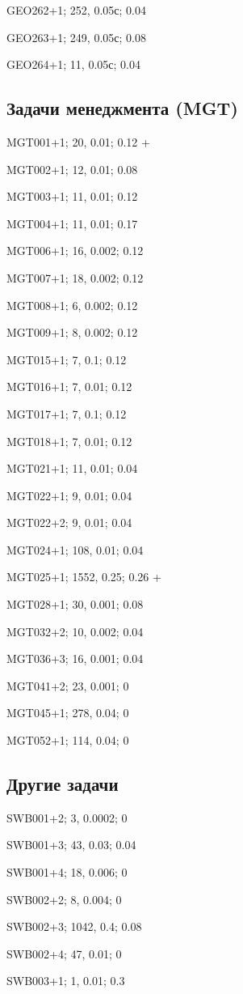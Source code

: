 GEO262+1; 252, 0.05с; 0.04

GEO263+1; 249, 0.05с; 0.08

GEO264+1; 11, 0.05с; 0.04


\subsection*{Задачи менеджмента (MGT)}

MGT001+1; 20, 0.01; 0.12 +

MGT002+1; 12, 0.01; 0.08

MGT003+1; 11, 0.01; 0.12

MGT004+1; 11, 0.01; 0.17

MGT006+1; 16, 0.002; 0.12

MGT007+1; 18, 0.002; 0.12

MGT008+1; 6, 0.002; 0.12

MGT009+1; 8, 0.002; 0.12

MGT015+1; 7, 0.1; 0.12

MGT016+1; 7, 0.01; 0.12

MGT017+1; 7, 0.1; 0.12

MGT018+1; 7, 0.01; 0.12

MGT021+1; 11, 0.01; 0.04

MGT022+1; 9, 0.01; 0.04

MGT022+2; 9, 0.01; 0.04

MGT024+1; 108, 0.01; 0.04

MGT025+1; 1552, 0.25; 0.26 +

MGT028+1; 30, 0.001; 0.08

MGT032+2; 10, 0.002; 0.04

MGT036+3; 16, 0.001; 0.04

MGT041+2; 23, 0.001; 0

MGT045+1; 278, 0.04; 0

MGT052+1; 114, 0.04; 0

\subsection*{Другие задачи}

SWB001+2; 3, 0.0002; 0

SWB001+3; 43, 0.03; 0.04

SWB001+4; 18, 0.006; 0

SWB002+2; 8, 0.004; 0

SWB002+3; 1042, 0.4; 0.08

SWB002+4; 47, 0.01; 0

SWB003+1; 1, 0.01; 0.3

